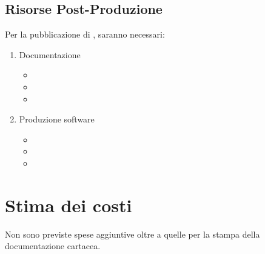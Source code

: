 \subsection{Risorse Post-Produzione}
Per la pubblicazione di \ProjectTitle{}, saranno necessari:
\begin{enumerate}
	\item Documentazione
	\begin{itemize}
		\item 
		\item 
		\item 
	\end{itemize}
	\item Produzione software
	\begin{itemize}
		\item 
		\item 
		\item 
	\end{itemize}
\end{enumerate}

\section{Stima dei costi}
Non sono previste spese aggiuntive oltre a quelle per la stampa della documentazione cartacea.